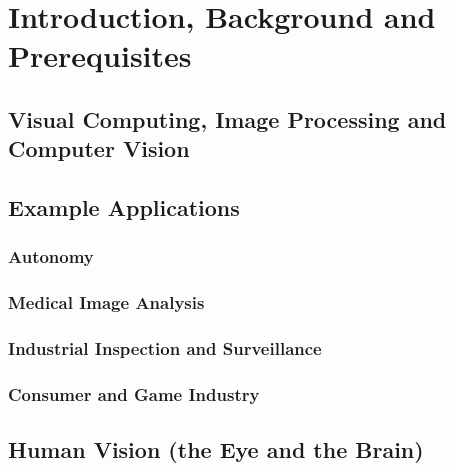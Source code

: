 
\chapter{Introduction, Background and Prerequisites} 
\label{booksection_0_Introduction_Background_and_Prerequisites}
\section{Visual Computing, Image Processing and Computer Vision} 
\label{booksection_1_Visual_Computing_Image_Processing_and_Computer_Vision}

\section{Example Applications} 
\label{booksection_2_Example_Applications}
\subsection{Autonomy} 
\label{booksection_3_Autonomy}

\subsection{Medical Image Analysis} 
\label{booksection_4_Medical_Image_Analysis}

\subsection{Industrial Inspection and Surveillance} 
\label{booksection_5_Industrial_Inspection_and_Surveillance}

\subsection{Consumer and Game Industry} 
\label{booksection_6_Consumer_and_Game_Industry}

\section{Human Vision (the Eye and the Brain)} 
\label{booksection_7_Human_Vision_(the_Eye_and_the_Brain)}

